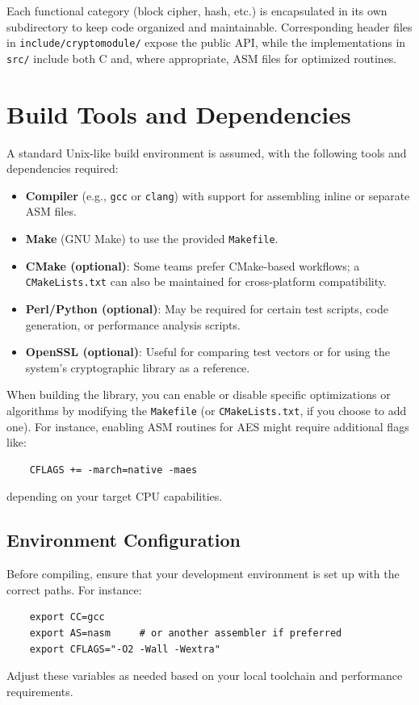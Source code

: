 \documentclass[11pt,a4paper]{report}
\theoremstyle{definitionstyle}
\begin{document}
Each functional category (block cipher, hash, etc.) is encapsulated in its own subdirectory to keep code organized and maintainable. Corresponding header files in \texttt{include/cryptomodule/} expose the public API, while the implementations in \texttt{src/} include both C and, where appropriate, ASM files for optimized routines.

\section{Build Tools and Dependencies}

A standard Unix-like build environment is assumed, with the following tools and dependencies required:

\begin{itemize}
	\item \textbf{Compiler} (e.g., \texttt{gcc} or \texttt{clang}) with support for assembling inline or separate ASM files.
	\item \textbf{Make} (GNU Make) to use the provided \texttt{Makefile}.
	\item \textbf{CMake (optional)}: Some teams prefer CMake-based workflows; a \texttt{CMakeLists.txt} can also be maintained for cross-platform compatibility.
	\item \textbf{Perl/Python (optional)}: May be required for certain test scripts, code generation, or performance analysis scripts.
	\item \textbf{OpenSSL (optional)}: Useful for comparing test vectors or for using the system’s cryptographic library as a reference.
\end{itemize}

When building the library, you can enable or disable specific optimizations or algorithms by modifying the \texttt{Makefile} (or \texttt{CMakeLists.txt}, if you choose to add one). For instance, enabling ASM routines for AES might require additional flags like:
\begin{lstlisting}
	CFLAGS += -march=native -maes
\end{lstlisting}
depending on your target CPU capabilities.

\subsection{Environment Configuration}

Before compiling, ensure that your development environment is set up with the correct paths. For instance:
\begin{lstlisting}
	export CC=gcc
	export AS=nasm     # or another assembler if preferred
	export CFLAGS="-O2 -Wall -Wextra"
\end{lstlisting}
Adjust these variables as needed based on your local toolchain and performance requirements.
\end{document}
